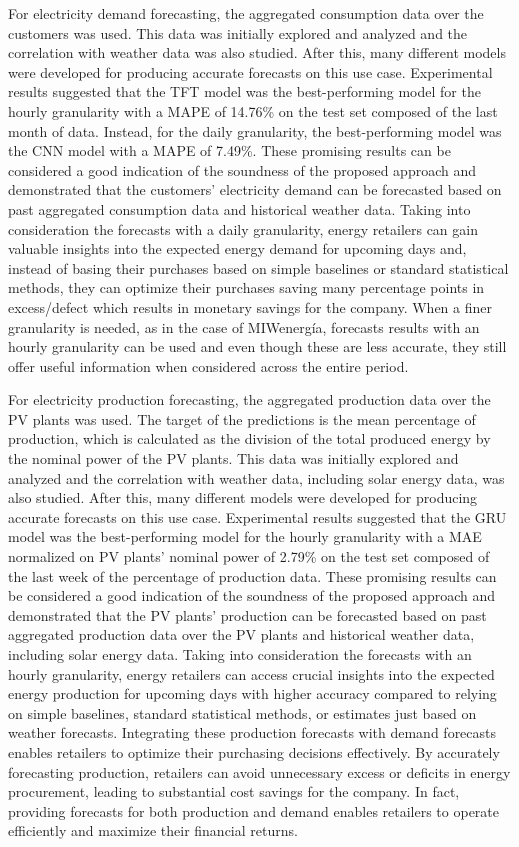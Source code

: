 For electricity demand forecasting, the aggregated consumption data over the customers was used.
This data was initially explored and analyzed and the correlation with weather data was also studied.
After this, many different models were developed for producing accurate forecasts on this use case.
Experimental results suggested that the TFT model was the best-performing model for the hourly granularity with a MAPE of 14.76\% on the test set composed of the last month of data.
Instead, for the daily granularity, the best-performing model was the CNN model with a MAPE of 7.49\%.
These promising results can be considered a good indication of the soundness of the proposed approach and demonstrated that the customers' electricity demand can be forecasted based on past aggregated consumption data and historical weather data.
Taking into consideration the forecasts with a daily granularity, energy retailers can gain valuable insights into the expected energy demand for upcoming days and, instead of basing their purchases based on simple baselines or standard statistical methods, they can optimize their purchases saving many percentage points in excess/defect which results in monetary savings for the company.
When a finer granularity is needed, as in the case of MIWenergía, forecasts results with an hourly granularity can be used and even though these are less accurate, they still offer useful information when considered across the entire period.

For electricity production forecasting, the aggregated production data over the PV plants was used.
The target of the predictions is the mean percentage of production, which is calculated as the division of the total produced energy by the nominal power of the PV plants.
This data was initially explored and analyzed and the correlation with weather data, including solar energy data, was also studied.
After this, many different models were developed for producing accurate forecasts on this use case.
Experimental results suggested that the GRU model was the best-performing model for the hourly granularity with a MAE normalized on PV plants' nominal power of 2.79\% on the test set composed of the last week of the percentage of production data.
These promising results can be considered a good indication of the soundness of the proposed approach and demonstrated that the PV plants' production can be forecasted based on past aggregated production data over the PV plants and historical weather data, including solar energy data.
Taking into consideration the forecasts with an hourly granularity, energy retailers can access crucial insights into the expected energy production for upcoming days with higher accuracy compared to relying on simple baselines, standard statistical methods, or estimates just based on weather forecasts.
Integrating these production forecasts with demand forecasts enables retailers to optimize their purchasing decisions effectively.
By accurately forecasting production, retailers can avoid unnecessary excess or deficits in energy procurement, leading to substantial cost savings for the company.
In fact, providing forecasts for both production and demand enables retailers to operate efficiently and maximize their financial returns.

